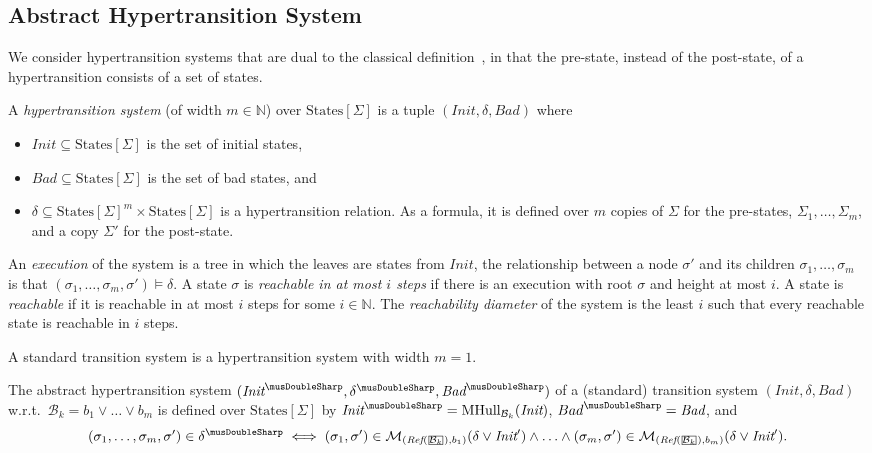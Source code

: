 \documentclass[acmsmall,screen]{acmart}
\newcommand{\vocabulary}{\Sigma}
\newcommand{\voc}{\vocabulary}
\newcommand{\Init}{{\textit{Init}}}
\newcommand{\Bad}{\textit{Bad}}
\newcommand{\States}{{\mbox{States}}[\voc]}
\newcommand{\tr}{\delta}
\newcommand{\bkwrch}[1]{\mathcal{B}_{#1}}
\newcommand{\monox}[2]{\mathcal{M}_{#2}({#1})}
\newcommand{\mhull}[2]{{\rm MHull}_{#2}({#1})}
\newcommand{\absr}[1]{{#1}^{\musDoubleSharp}}
\newcommand{\bkcube}{b}
\newcommand{\reflect}[1]{\textit{Ref}({#1})}
\newcommand\mathbox[1]{\mathord{\ThisStyle{%
  \fboxsep0\LMpt\relax\kern1\LMpt\fbox{$\SavedStyle#1$}\kern1\LMpt}}}
\newcommand{\cubejoin}[1]{\mathbox{#1}}
\begin{document}
\subsection{Abstract Hypertransition System}
\label{sec:abstract-hypertransition}
We consider hypertransition systems that are dual to the classical definition~\cite[e.g.][]{DBLP:conf/lics/LarsenX90}, in that the pre-state, instead of the post-state, of a hypertransition consists of a set of states.
\begin{definition}
A \emph{hypertransition system} (of width $m \in \mathbb{N}$) over $\States$ is a tuple $(\Init,\tr,\Bad)$ where
\begin{itemize}
	\item $\Init \subseteq \States$ is the set of initial states,
	\item $\Bad \subseteq \States$ is the set of bad states, and
	\item $\tr \subseteq \States^m \times \States$ is a hypertransition relation.
		   As a formula, it is defined over $m$ copies of $\voc$ for the pre-states, $\voc_1,\ldots,\voc_m$, and a copy $\voc'$ for the post-state.
\end{itemize}
An \emph{execution} of the system is a tree in which the leaves are states from $\Init$, the relationship between a node $\sigma'$ and its children $\sigma_1,\ldots,\sigma_m$ is that $(\sigma_1,\ldots,\sigma_m,\sigma') \models \tr$. %
A state $\sigma$ is \emph{reachable in at most $i$ steps} if there is an execution with root $\sigma$ and height at most $i$.
A state is \emph{reachable} if it is reachable in at most $i$ steps for some $i \in \mathbb{N}$.
The \emph{reachability diameter} of the system is the least $i$ such that every reachable state is reachable in $i$ steps.
\end{definition}
A standard transition system is a hypertransition system with width $m=1$.
%

\begin{definition}
\label{def:abs-hypertr}
The abstract hypertransition system $(\absr{\Init},\absr{\tr},\absr{\Bad})$ of a (standard) transition system $(\Init,\tr,\Bad)$ w.r.t.\ $\bkwrch{k} = \bkcube_1 \lor \ldots \lor \bkcube_m$
is defined over $\States$ by $\absr{\Init} = \mhull{\Init}{\bkwrch{k}}$, $\absr{Bad} = \Bad$, and
\begin{equation*}
	(\sigma_1,\ldots,\sigma_m,\sigma') \in \absr{\tr} \iff
			(\sigma_1,\sigma') \in \monox{\tr \lor \Init'}{(\reflect{\cubejoin{\bkwrch{k}}},\bkcube_1)}
		\land
			\ldots
		\land
			(\sigma_m,\sigma') \in \monox{\tr \lor \Init'}{(\reflect{\cubejoin{\bkwrch{k}}},\bkcube_m)}.
\end{equation*}
\end{definition}
\end{document}
